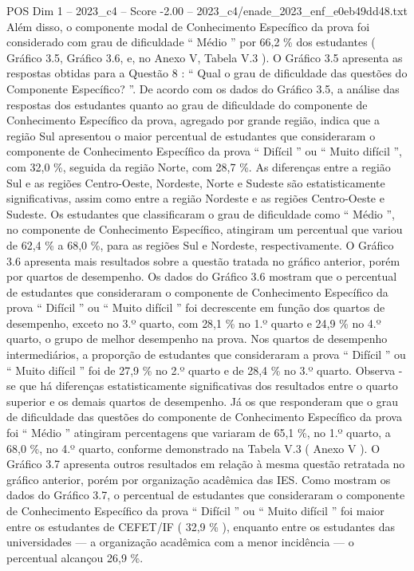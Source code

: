 \begin{textsample}{POS Dim 1 – 2023\_c4 – Score -2.00 – 2023\_c4/enade\_2023\_enf\_e0eb49dd48.txt}
Além disso, o componente modal de Conhecimento Específico da prova foi considerado com grau de dificuldade “ Médio ” por 66,2 \% dos estudantes ( Gráfico 3.5, Gráfico 3.6, e, no Anexo V, Tabela V.3 ).
O Gráfico 3.5 apresenta as respostas obtidas para a Questão 8 : “ Qual o grau de dificuldade das questões do Componente Específico? ”.
De acordo com os dados do Gráfico 3.5, a análise das respostas dos estudantes quanto ao grau de dificuldade do componente de Conhecimento Específico da prova, agregado por grande região, indica que a região Sul apresentou o maior percentual de estudantes que consideraram o componente de Conhecimento Específico da prova “ Difícil ” ou “ Muito difícil ”, com 32,0 \%, seguida da região Norte, com 28,7 \%.
As diferenças entre a região Sul e as regiões Centro-Oeste, Nordeste, Norte e Sudeste são estatisticamente significativas, assim como entre a região Nordeste e as regiões Centro-Oeste e Sudeste.
Os estudantes que classificaram o grau de dificuldade como “ Médio ”, no componente de Conhecimento Específico, atingiram um percentual que variou de 62,4 \% a 68,0 \%, para as regiões Sul e Nordeste, respectivamente.
O Gráfico 3.6 apresenta mais resultados sobre a questão tratada no gráfico anterior, porém por quartos de desempenho.
Os dados do Gráfico 3.6 mostram que o percentual de estudantes que consideraram o componente de Conhecimento Específico da prova “ Difícil ” ou “ Muito difícil ” foi decrescente em função dos quartos de desempenho, exceto no 3.º quarto, com 28,1 \% no 1.º quarto e 24,9 \% no 4.º quarto, o grupo de melhor desempenho na prova.
Nos quartos de desempenho intermediários, a proporção de estudantes que consideraram a prova “ Difícil ” ou “ Muito difícil ” foi de 27,9 \% no 2.º quarto e de 28,4 \% no 3.º quarto.
Observa -se que há diferenças estatisticamente significativas dos resultados entre o quarto superior e os demais quartos de desempenho.
Já os que responderam que o grau de dificuldade das questões do componente de Conhecimento Específico da prova foi “ Médio ” atingiram percentagens que variaram de 65,1 \%, no 1.º quarto, a 68,0 \%, no 4.º quarto, conforme demonstrado na Tabela V.3 ( Anexo V ).
O Gráfico 3.7 apresenta outros resultados em relação à mesma questão retratada no gráfico anterior, porém por organização acadêmica das IES.
Como mostram os dados do Gráfico 3.7, o percentual de estudantes que consideraram o componente de Conhecimento Específico da prova “ Difícil ” ou “ Muito difícil ” foi maior entre os estudantes de CEFET/IF ( 32,9 \% ), enquanto entre os estudantes das universidades — a organização acadêmica com a menor incidência — o percentual alcançou 26,9 \%.

\end{textsample}
